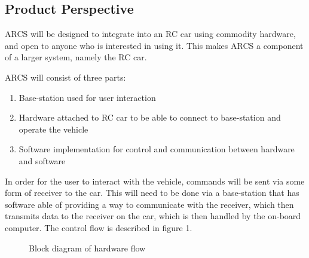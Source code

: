 \documentclass[compsoc,draftclsnofoot,onecolumn,10pt]{IEEEtran}
\begin{document}
\subsection{Product Perspective} %
ARCS will be designed to integrate into an RC car using commodity hardware, and open to anyone who is interested in using it. This 
makes ARCS a component of a larger system, namely the RC car. \par
ARCS will consist of three parts: 
\begin{enumerate}
	\item Base-station used for user interaction
	\item Hardware attached to RC car to be able to connect to base-station and 
		operate the vehicle
	\item Software implementation for control and communication between hardware and software
\end{enumerate}
In order for the user to interact with the vehicle, commands will be sent via some form
of receiver to the car. This will need to be done via a base-station that has software able of
providing a way to communicate with the receiver, which then transmits data to the receiver on 
the car, which is then handled by the on-board computer. 
The control flow is described in figure 1. \\

\begin{figure}
  \centering
  \vspace{10cm}
  \caption{Block diagram of hardware flow}
\end{figure}


%
\end{document}
